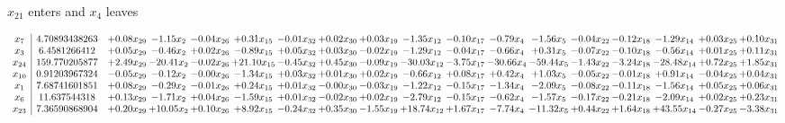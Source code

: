 \documentclass[9pt]{article}
\begin{document}
 $ x_{21} $ enters and $ x_{4} $ leaves 

 \[\begin{array}{c| c c@{\hskip 2pt} c@{\hskip 2pt} c@{\hskip 2pt} c@{\hskip 2pt} c@{\hskip 2pt} c@{\hskip 2pt} c@{\hskip 2pt} c@{\hskip 2pt} c@{\hskip 2pt} c@{\hskip 2pt} c@{\hskip 2pt} c@{\hskip 2pt} c@{\hskip 2pt} c@{\hskip 2pt} c@{\hskip 2pt} c@{\hskip 2pt} }
 x_{7}   &  4.70893438263 & +  0.08 x_{29} & -1.15 x_{2} & -0.04 x_{26} & +  0.31 x_{15} & -0.01 x_{32} & +  0.02 x_{30} & +  0.03 x_{19} & -1.35 x_{12} & -0.10 x_{17} & -0.79 x_{4} & -1.56 x_{5} & -0.04 x_{22} & -0.12 x_{18} & -1.29 x_{14} & +  0.03 x_{25} & +  0.10 x_{31}\\
 x_{3}   &  6.4581266412 & +  0.05 x_{29} & -0.46 x_{2} & +  0.02 x_{26} & -0.89 x_{15} & +  0.05 x_{32} & +  0.03 x_{30} & -0.02 x_{19} & -1.29 x_{12} & -0.04 x_{17} & -0.66 x_{4} & +  0.31 x_{5} & -0.07 x_{22} & -0.10 x_{18} & -0.56 x_{14} & +  0.01 x_{25} & +  0.11 x_{31}\\
 x_{24}   &  159.770205877 & +  2.49 x_{29} & -20.41 x_{2} & -0.02 x_{26} & + 21.10 x_{15} & -0.45 x_{32} & +  0.45 x_{30} & -0.09 x_{19} & -30.03 x_{12} & -3.75 x_{17} & -30.66 x_{4} & -59.44 x_{5} & -1.43 x_{22} & -3.24 x_{18} & -28.48 x_{14} & +  0.72 x_{25} & +  1.85 x_{31}\\
 x_{10}   &  0.91203967324 & -0.05 x_{29} & -0.12 x_{2} & -0.00 x_{26} & -1.34 x_{15} & +  0.03 x_{32} & +  0.01 x_{30} & +  0.02 x_{19} & -0.66 x_{12} & +  0.08 x_{17} & +  0.42 x_{4} & +  1.03 x_{5} & -0.05 x_{22} & -0.01 x_{18} & +  0.91 x_{14} & -0.04 x_{25} & +  0.04 x_{31}\\
 x_{1}   &  7.68741601851 & +  0.08 x_{29} & -0.29 x_{2} & -0.01 x_{26} & +  0.24 x_{15} & +  0.01 x_{32} & -0.00 x_{30} & -0.03 x_{19} & -1.22 x_{12} & -0.15 x_{17} & -1.34 x_{4} & -2.09 x_{5} & -0.08 x_{22} & -0.11 x_{18} & -1.56 x_{14} & +  0.05 x_{25} & +  0.06 x_{31}\\
 x_{6}   &  11.637544318 & +  0.13 x_{29} & -1.71 x_{2} & +  0.04 x_{26} & -1.59 x_{15} & +  0.01 x_{32} & -0.02 x_{30} & +  0.02 x_{19} & -2.79 x_{12} & -0.15 x_{17} & -0.62 x_{4} & -1.57 x_{5} & -0.17 x_{22} & -0.21 x_{18} & -2.09 x_{14} & +  0.02 x_{25} & +  0.23 x_{31}\\
 x_{23}   &  7.36590868904 & +  0.20 x_{29} & + 10.05 x_{2} & +  0.10 x_{26} & +  8.92 x_{15} & -0.24 x_{32} & +  0.35 x_{30} & -1.55 x_{19} & + 18.74 x_{12} & +  1.67 x_{17} & -7.74 x_{4} & -11.32 x_{5} & +  0.44 x_{22} & +  1.64 x_{18} & + 43.55 x_{14} & -0.27 x_{25} & -3.38 x_{31}\\

\end{array}\]
\end{document}
